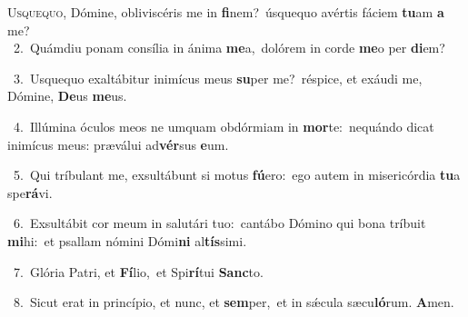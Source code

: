 \lettrine{\initial\textcolor{\initialcolor}{U}}{squequo,} Dómine, obliviscéris me in \textbf{fi}\-nem?~\star úsquequo avértis fáciem \textbf{tu}\-am \textbf{a} me?\\
{\numbfont\textcolor{\numbcolor}{~2.}}~Quámdiu ponam consília in ánima \textbf{me}\-a,~\star dolórem in corde \textbf{me}\-o per \textbf{di}\-em?\par
{\numbfont\textcolor{\numbcolor}{~3.}}~Usquequo exaltábitur inimícus meus \textbf{su}\-per me?~\star réspice, et exáudi me, Dómine, \textbf{De}\-us \textbf{me}\-us.\par
{\numbfont\textcolor{\numbcolor}{~4.}}~Illúmina óculos meos ne umquam obdórmiam in \textbf{mor}\-te:~\star nequándo dicat inimícus meus: præválui ad\-\textbf{vér}\-sus \textbf{e}\-um.\par
{\numbfont\textcolor{\numbcolor}{~5.}}~Qui tríbulant me, exsultábunt si motus \textbf{fú}\-ero:~\star ego autem in misericórdia \textbf{tu}\-a spe\-\textbf{rá}\-vi.\par
{\numbfont\textcolor{\numbcolor}{~6.}}~Exsultábit cor meum in salutári tuo:~\dagger cantábo Dómino qui bona tríbuit \textbf{mi}\-hi:~\star et psallam nómini Dómi\textbf{ni} al\-\textbf{tís}\-simi.\par
{\numbfont\textcolor{\numbcolor}{~7.}}~Glória Patri, et \textbf{Fí}\-lio,~\star et Spi\-\textbf{rí}\-tui \textbf{Sanc}\-to.\par
{\numbfont\textcolor{\numbcolor}{~8.}}~Sicut erat in princípio, et nunc, et \textbf{sem}\-per,~\star et in sǽcula sæcu\-\textbf{ló}\-rum. \textbf{A}\-men.\par
